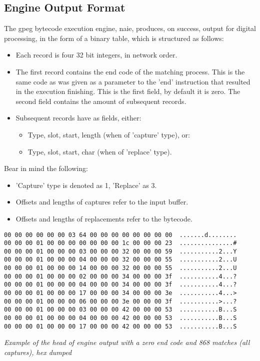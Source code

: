 \subsection{Engine Output Format}

The gpeg bytecode execution engine, naie, produces, on success, output for
digital processing, in the form of a binary table, which is structured
as follows:

\begin{itemize}

\item Each record is four 32 bit integers, in network order.

\item The first record contains the end code of the matching process.
This is the same code as was given as a parameter to the 'end'
instruction that resulted in the execution finishing. This is the
first field, by default it is zero.
The second field contains the amount of subsequent records.

\item Subsequent records have as fields, either:

\begin{itemize}
\item Type, slot, start, length (when of 'capture' type), or:
\item Type, slot, start, char (when of 'replace' type).
\end{itemize}

\end{itemize}

Bear in mind the following:

\begin{itemize}
\item 'Capture' type is denoted as 1, 'Replace' as 3.
\item Offsets and lengths of captures refer to the input buffer.
\item Offsets and lengths of replacements refer to the bytecode.
\end{itemize}

\begin{myquote}
\begin{verbatim}
00 00 00 00 00 00 03 64 00 00 00 00 00 00 00 00  .......d........
00 00 00 01 00 00 00 00 00 00 00 1c 00 00 00 23  ...............#
00 00 00 01 00 00 00 03 00 00 00 32 00 00 00 59  ...........2...Y
00 00 00 01 00 00 00 04 00 00 00 32 00 00 00 55  ...........2...U
00 00 00 01 00 00 00 14 00 00 00 32 00 00 00 55  ...........2...U
00 00 00 01 00 00 00 02 00 00 00 34 00 00 00 3f  ...........4...?
00 00 00 01 00 00 00 04 00 00 00 34 00 00 00 3f  ...........4...?
00 00 00 01 00 00 00 17 00 00 00 34 00 00 00 3e  ...........4...>
00 00 00 01 00 00 00 06 00 00 00 3e 00 00 00 3f  ...........>...?
00 00 00 01 00 00 00 03 00 00 00 42 00 00 00 53  ...........B...S
00 00 00 01 00 00 00 04 00 00 00 42 00 00 00 53  ...........B...S
00 00 00 01 00 00 00 17 00 00 00 42 00 00 00 53  ...........B...S
\end{verbatim}
\end{myquote}
\textit{Example of the head of engine output with a zero end code
and 868 matches (all captures), hex dumped}
